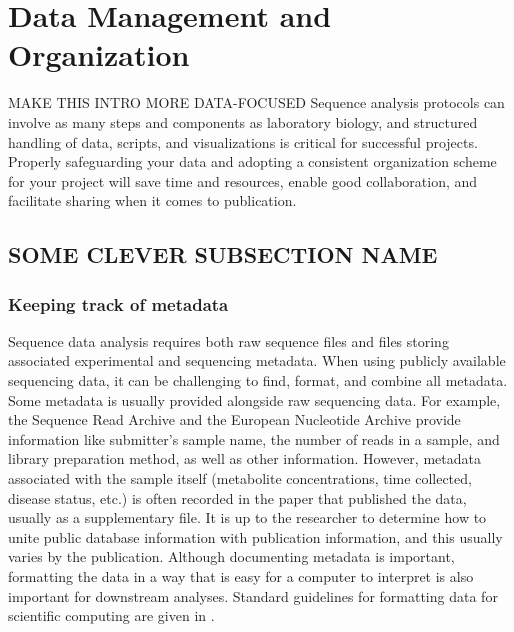 \documentclass[10pt,letterpaper]{article}
\begin{document}
\section*{Data Management and Organization} %

MAKE THIS INTRO MORE DATA-FOCUSED
Sequence analysis protocols can involve as many steps and components as laboratory biology, and structured handling of data, scripts, and visualizations is critical for successful projects. Properly safeguarding your data and adopting a consistent organization scheme for your project will save time and resources, enable good collaboration, and facilitate sharing when it comes to publication.

\subsection*{SOME CLEVER SUBSECTION NAME}

\subsubsection*{Keeping track of metadata} %
Sequence data analysis requires both raw sequence files and files storing associated experimental and sequencing metadata. When using publicly available sequencing data, it can be challenging to find, format, and combine all metadata. Some metadata is usually provided alongside raw sequencing data. For example, the Sequence Read Archive and the European Nucleotide Archive provide information like submitter’s sample name, the number of reads in a sample, and library preparation method, as well as other information. However, metadata associated with the sample itself (metabolite concentrations, time collected, disease status, etc.) is often recorded in the paper that published the data, usually as a supplementary file. It is up to the researcher to determine how to unite public database information with publication information, and this usually varies by the publication. Although documenting metadata is important, formatting the data in a way that is easy for a computer to interpret is also important for downstream analyses. Standard guidelines for formatting data for scientific computing are given in \cite{wilson2017good}. 
\end{document}
